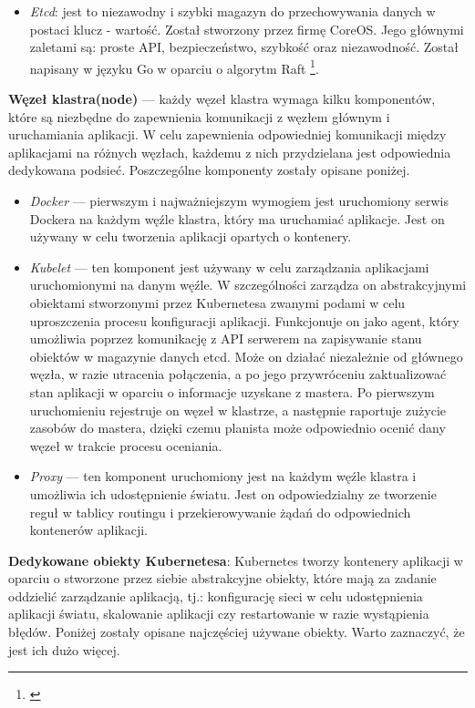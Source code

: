 \documentclass[12pt]{report}
\begin{document}
{\begin{itemize}
\item{{\it Etcd}: jest to niezawodny i szybki magazyn do przechowywania danych w postaci klucz - wartość. Został stworzony przez firmę CoreOS. Jego głównymi zaletami są: proste API, bezpieczeństwo, szybkość oraz niezawodność. Został napisany w języku Go w oparciu o algorytm Raft \footnote{\cite{}}.}
\end{itemize}
{\bf Węzeł klastra(node)} --- każdy węzeł klastra wymaga kilku komponentów, które są niezbędne do zapewnienia komunikacji z węzłem głównym i uruchamiania aplikacji. W celu zapewnienia odpowiedniej komunikacji między aplikacjami na różnych węzłach, każdemu z nich przydzielana jest odpowiednia dedykowana podsieć. Poszczególne komponenty zostały opisane poniżej.

\begin{itemize}
\item{{\it Docker} --- pierwszym i najważniejszym wymogiem jest uruchomiony serwis Dockera na każdym węźle klastra, który ma uruchamiać aplikacje. Jest on używany w celu tworzenia aplikacji opartych o kontenery.}

\item{{\it Kubelet} --- ten komponent jest używany w celu zarządzania aplikacjami uruchomionymi na danym węźle. W szczególności zarządza on abstrakcyjnymi obiektami stworzonymi przez Kubernetesa zwanymi podami w celu uproszczenia procesu konfiguracji aplikacji. Funkcjonuje on jako agent, który umożliwia poprzez komunikację z API serwerem na zapisywanie stanu obiektów w magazynie danych etcd. Może on działać niezależnie od głównego węzła, w razie utracenia połączenia, a po jego przywróceniu zaktualizować stan aplikacji w oparciu o informacje uzyskane z mastera. Po pierwszym uruchomieniu rejestruje on węzeł w klastrze, a następnie raportuje zużycie zasobów do mastera, dzięki czemu planista może odpowiednio ocenić dany węzeł w trakcie procesu oceniania.}

\item{{\it Proxy} --- ten komponent uruchomiony jest na każdym węźle klastra i umożliwia ich udostępnienie światu. Jest on odpowiedzialny ze tworzenie reguł w tablicy routingu i przekierowywanie żądań do odpowiednich kontenerów aplikacji.}
\end{itemize}
{\bf Dedykowane obiekty Kubernetesa}: Kubernetes tworzy kontenery aplikacji w oparciu o stworzone przez siebie abstrakcyjne obiekty, które mają za zadanie oddzielić zarządzanie aplikacją, tj.: konfigurację sieci w celu udostępnienia aplikacji światu, skalowanie aplikacji czy restartowanie w razie wystąpienia błędów. Poniżej zostały opisane najczęściej używane obiekty. Warto zaznaczyć, że jest ich dużo więcej.

}
\end{document}
